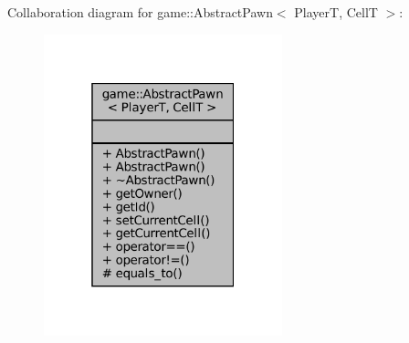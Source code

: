 Collaboration diagram for game\+:\+:Abstract\+Pawn$<$ PlayerT, CellT $>$\+:
\nopagebreak
\begin{figure}[H]
\begin{center}
\leavevmode
\includegraphics[width=196pt]{classgame_1_1_abstract_pawn__coll__graph}
\end{center}
\end{figure}
